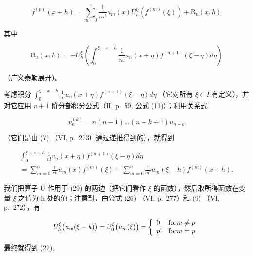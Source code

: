 \[
f ^ {(p)} (x + h) = \sum_ {m = 0} ^ {n} \frac {1}{m !} u _ {m} (x) U _ {h} ^ {\xi} \left(f ^ {(m)} (\xi)\right) + \mathrm{R} _ {n} (x, h)\tag{27}
\]

其中

\[
\mathrm{R} _ {n} (x, h) = - U _ {h} ^ {\xi} \left(\int_ {0} ^ {\xi - x - h} \frac {1}{n !} u _ {n} (x + \eta) f ^ {(n + 1)} (\xi - \eta) d \eta\right)\tag{28}
\]

（广义泰勒展开）。

考虑积分 \(\int_{0}^{\xi-x-h}\frac{1}{n!}u_{n}(x+\eta)f^{(n+1)}(\xi-\eta)d\eta\) （它对所有 \(\xi\in I\) 有定义），并对它应用 \(n+1\) 阶分部积分公式（II, p.~59, 公式 (11)）；利用关系式

\[
u _ {n} ^ {(k)} = n (n - 1) \dots (n - k + 1) u _ {n - k}
\]

（它们是由 (7) （VI, p.~273）通过递推得到的），就得到

\[
\begin{array}{l} \int_ {0} ^ {\xi - x - h} \frac {1}{n !} u _ {n} (x + \eta) f ^ {(n + 1)} (\xi - \eta) d \eta \\ = \sum_ {m = 0} ^ {n} \frac {1}{m !} u _ {m} (x) f ^ {(m)} (\xi) - \sum_ {m = 0} ^ {n} \frac {1}{m !} u _ {m} (\xi - h) f ^ {(m)} (x + h). \end{array}\tag{29}
\]

我们把算子 U 作用于 (29) 的两边（把它们看作 \(\xi\) 的函数），然后取所得函数在变量 \(\xi\) 之值为 h 处的值；注意到，由公式 (26) （VI, p.~277）和 (9) （VI, p.~272），有

\[
U _ {h} ^ {\xi} \big (u _ {m} (\xi - h) \big) = U _ {0} ^ {\xi} \big (u _ {m} (\xi) \big) = \left\{ \begin{array}{l l} 0 & \text {for} m \neq p \\ p! & \text {for} m = p \end{array} \right.
\]

最终就得到 (27)。

